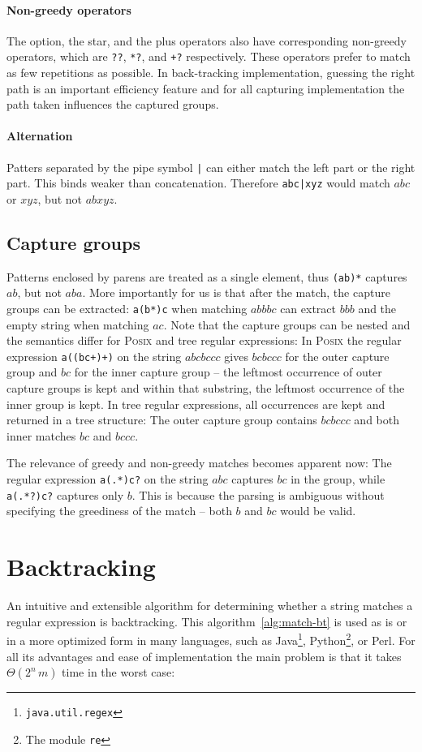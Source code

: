 \documentclass[11pt,a4paper,twoside,openright]{Thesis}
\theoremstyle{definition}
\newcommand{\seclabel}[1]{\label{sec:#1}}
\begin{document}
\paragraph{Non-greedy operators} The option, the star, and the plus operators
also have corresponding non-greedy operators, which are \texttt{??},
\texttt{*?}, and \texttt{+?} respectively. These operators prefer to match as
few repetitions as possible. In back-tracking implementation, guessing the
right path is an important efficiency feature and for all capturing
implementation the path taken influences the captured groups.

\paragraph{Alternation} Patters separated by the pipe symbol \texttt{|} can
either match the left part or the right part. This binds weaker than
concatenation. Therefore \texttt{abc|xyz} would match $abc$ or $xyz$, but not
$abxyz$.

\subsection{Capture groups}
Patterns enclosed by parens are treated as a single element, thus
\texttt{(ab)*} captures $ab$, but not $aba$. More importantly for us is that
after the match, the capture groups can be extracted: \texttt{a(b*)c} when
matching $abbbc$ can extract $bbb$ and the empty string when matching $ac$.
Note that the capture groups can be nested and the semantics differ for
\textsc{Posix} and tree regular expressions: In \textsc{Posix} the regular expression
\texttt{a((bc+)+)} on the string $abcbccc$ gives $bcbccc$ for the outer
capture group and $bc$ for the inner capture group -- the leftmost occurrence of
outer capture groups is kept and within that substring, the leftmost occurrence
of the inner group is kept. In tree regular expressions, all occurrences are kept and returned
in a tree structure: The outer capture group contains $bcbccc$ and both inner
matches $bc$ and $bccc$.

The relevance of greedy and non-greedy matches becomes apparent now: The
regular expression \texttt{a(.*)c?} on the string $abc$ captures $bc$ in
the group, while \texttt{a(.*?)c?} captures only $b$. This is because
the parsing is ambiguous without specifying the greediness of the match -- both
$b$ and $bc$ would be valid.

\section{Backtracking}\seclabel{backtracking}
An intuitive and extensible algorithm for determining whether a string
matches a regular expression is backtracking. This
algorithm~\ref{alg:match-bt} is used as is or in a more optimized form in
many languages, such as Java\footnote{\texttt{java.util.regex}},
Python\footnote{The module \texttt{re}}, or Perl\cite{Cox07a}. For all its
advantages and ease of implementation the main problem is that it takes
$\Theta(2^n\,m)$ time in the worst case:
\end{document}
